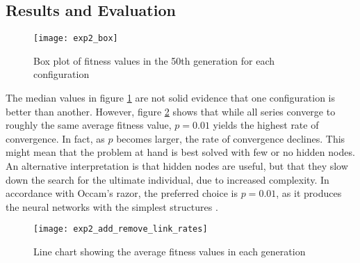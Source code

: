 \subsection{Results and Evaluation}

\begin{figure}[H]
    \centering
    \texttt{[image: exp2\_box]}
    \caption{Box plot of fitness values in the 50th generation for each configuration}
    \label{fig:exp2_box}
\end{figure}

The median values in figure \ref{fig:exp2_box} are not solid evidence that one configuration is better than another. However, figure \ref{fig:exp2_add_remove_link_rates} shows that while all series converge to roughly the same average fitness value, $p=0.01$ yields the highest rate of convergence. In fact, as $p$ becomes larger, the rate of convergence declines. This might mean that the problem at hand is best solved with few or no hidden nodes. An alternative interpretation is that hidden nodes are useful, but that they slow down the search for the ultimate individual, due to increased complexity. In accordance with Occam's razor, the preferred choice is $p=0.01$, as it produces the neural networks with the simplest structures \citep{mitchell1997}.

\begin{figure}[H]
    \centering
    \texttt{[image: exp2\_add\_remove\_link\_rates]}
    \caption{Line chart showing the average fitness values in each generation}
    \label{fig:exp2_add_remove_link_rates}
\end{figure}


